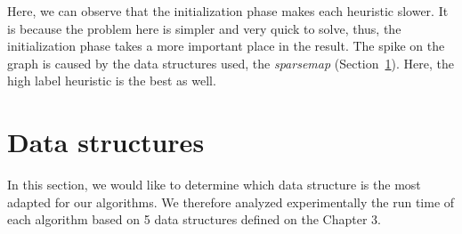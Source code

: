 Here, we can observe that the initialization phase makes each heuristic slower. It is because the problem here is simpler and very quick to solve, thus, the initialization phase takes a more important place in the result. The spike on the graph is caused by the data structures used, the \textit{sparsemap} (Section~\ref{sec:datastructuress}). Here, the high label heuristic is the best as well.


\section{Data structures}

\label{sec:datastructuress}
In this section, we would like to determine which data structure is the most adapted for our algorithms. We therefore analyzed experimentally the run time of each algorithm based on 5 data structures defined on the Chapter 3.
